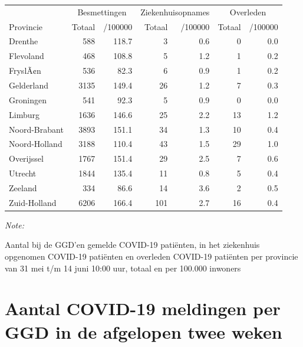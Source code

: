 \documentclass[
  english,
  man,floatsintext]{apa6}
\begin{document}
\begin{table}
\centering
\begin{threeparttable}
\begin{tabular}{lrrrrrr}
\toprule
\multicolumn{1}{c}{ } & \multicolumn{2}{c}{Besmettingen} & \multicolumn{2}{c}{Ziekenhuisopnames} & \multicolumn{2}{c}{Overleden} \\
\cmidrule(l{3pt}r{3pt}){2-3} \cmidrule(l{3pt}r{3pt}){4-5} \cmidrule(l{3pt}r{3pt}){6-7}
Provincie & Totaal & /100000 & Totaal & /100000 & Totaal & /100000\\
\midrule
Drenthe & 588 & 118.7 & 3 & 0.6 & 0 & 0.0\\
Flevoland & 468 & 108.8 & 5 & 1.2 & 1 & 0.2\\
FryslÃ¢n & 536 & 82.3 & 6 & 0.9 & 1 & 0.2\\
Gelderland & 3135 & 149.4 & 26 & 1.2 & 7 & 0.3\\
Groningen & 541 & 92.3 & 5 & 0.9 & 0 & 0.0\\
Limburg & 1636 & 146.6 & 25 & 2.2 & 13 & 1.2\\
Noord-Brabant & 3893 & 151.1 & 34 & 1.3 & 10 & 0.4\\
Noord-Holland & 3188 & 110.4 & 43 & 1.5 & 29 & 1.0\\
Overijssel & 1767 & 151.4 & 29 & 2.5 & 7 & 0.6\\
Utrecht & 1844 & 135.4 & 11 & 0.8 & 5 & 0.4\\
Zeeland & 334 & 86.6 & 14 & 3.6 & 2 & 0.5\\
Zuid-Holland & 6206 & 166.4 & 101 & 2.7 & 16 & 0.4\\
\bottomrule
\end{tabular}
\begin{tablenotes}
\item \textit{Note: } 
\item Aantal bij de GGD’en gemelde COVID-19 patiënten, in het ziekenhuis opgenomen COVID-19 patiënten en overleden COVID-19 patiënten per provincie van 31 mei t/m 14 juni 10:00 uur, totaal en per 100.000 inwoners
\end{tablenotes}
\end{threeparttable}
\end{table}

\newpage

\hypertarget{aantal-covid-19-meldingen-per-ggd-in-de-afgelopen-twee-weken}{%
\section{Aantal COVID-19 meldingen per GGD in de afgelopen twee weken}\label{aantal-covid-19-meldingen-per-ggd-in-de-afgelopen-twee-weken}}
\end{document}

